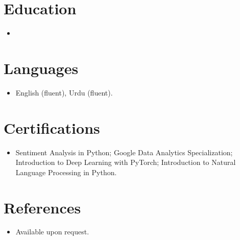 \documentclass[11pt,a4paper,sans]{moderncv}
\begin{document}
\section{Education}
\vspace{1pt}
\begin{itemize}
\item{}
\end{itemize}

\section{Languages}
\vspace{1pt}
\begin{itemize}
\item{English (fluent), Urdu (fluent).}
\end{itemize}

\section{Certifications}
\vspace{1pt}
\begin{itemize}
\item{Sentiment Analysis in Python; Google Data Analytics Specialization; Introduction to Deep Learning with PyTorch; Introduction to Natural Language Processing in Python.}
\end{itemize}

\section{References}
\vspace{1pt}
\begin{itemize}
\item{Available upon request.}
\end{itemize}
\end{document}
